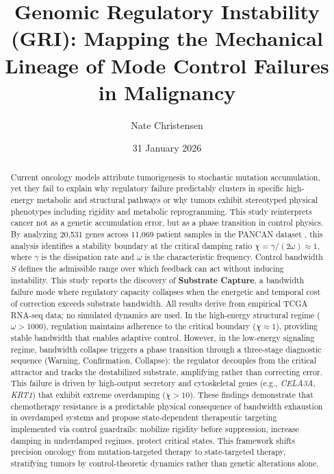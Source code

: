 \documentclass[11pt,letterpaper]{article}
\begin{document}

\title{Genomic Regulatory Instability (GRI): Mapping the Mechanical Lineage of Mode Control Failures in Malignancy}

\author{Nate Christensen}

\date{31 January 2026}

\maketitle

\begin{abstract}
Current oncology models attribute tumorigenesis to stochastic mutation accumulation, yet they fail to explain why regulatory failure predictably clusters in specific high-energy metabolic and structural pathways or why tumors exhibit stereotyped physical phenotypes including rigidity and metabolic reprogramming. This study reinterprets cancer not as a genetic accumulation error, but as a phase transition in control physics. By analyzing 20,531 genes across 11,069 patient samples in the PANCAN dataset \cite{TCGA2018}, this analysis identifies a stability boundary at the critical damping ratio $\chi = \gamma/(2\omega) \approx 1$, where $\gamma$ is the dissipation rate and $\omega$ is the characteristic frequency. Control bandwidth $S$ defines the admissible range over which feedback can act without inducing instability. This study reports the discovery of \textbf{Substrate Capture}, a bandwidth failure mode where regulatory capacity collapses when the energetic and temporal cost of correction exceeds substrate bandwidth. All results derive from empirical TCGA RNA-seq data; no simulated dynamics are used. In the high-energy structural regime ($\omega > 1000$), regulation maintains adherence to the critical boundary ($\chi \approx 1$), providing stable bandwidth that enables adaptive control. However, in the low-energy signaling regime, bandwidth collapse triggers a phase transition through a three-stage diagnostic sequence (Warning, Confirmation, Collapse): the regulator decouples from the critical attractor and tracks the destabilized substrate, amplifying rather than correcting error. This failure is driven by high-output secretory and cytoskeletal genes (e.g., \textit{CELA3A}, \textit{KRT1}) that exhibit extreme overdamping ($\chi > 10$). These findings demonstrate that chemotherapy resistance is a predictable physical consequence of bandwidth exhaustion in overdamped systems and propose state-dependent therapeutic targeting implemented via control guardrails: mobilize rigidity before suppression, increase damping in underdamped regimes, protect critical states. This framework shifts precision oncology from mutation-targeted therapy to state-targeted therapy, stratifying tumors by control-theoretic dynamics rather than genetic alterations alone.
\end{abstract}
\end{document}
